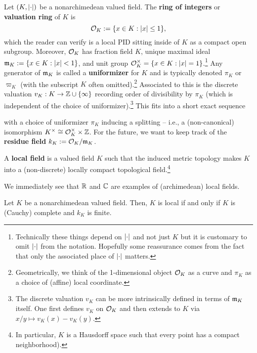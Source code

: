 \documentclass[11pt]{article}
\begin{document}
Let $(K,\left\lvert\cdot\right\rvert)$ be a nonarchimedean valued field. The \textbf{ring of integers} or \textbf{valuation ring} of $K$ is 
$$\mathcal{O}_K:=\{x\in K : |x|\leq1\},$$
which the reader can verify is a local PID sitting inside of $K$ as a compact open subgroup. Moreover, $\mathcal{O}_K$ has fraction field $K$, unique maximal ideal $\mathfrak{m}_K:=\{x\in K : |x|<1\}$, and unit group $\mathcal{O}_K^{\times}=\{x\in K : |x|=1\}$.\footnote{Technically these things depend on $\left\lvert\cdot\right\rvert$ and not just $K$ but it is customary to omit $\left\lvert\cdot\right\rvert$ from the notation. Hopefully some reassurance comes from the fact that only the associated place of $\left\lvert\cdot\right\rvert$ matters.} Any generator of $\mathfrak{m}_K$ is called a \textbf{uniformizer} for $K$ and is typically denoted $\pi_K$ or $\varpi_K$ (with the subscript $K$ often omitted).\footnote{Geometrically, we think of the 1-dimensional object $\mathcal{O}_K$ as a curve and $\pi_K$ as a choice of (affine) local coordinate.} Associated to this is the discrete valuation $v_K: K\to\mathbb{Z}\cup\{\infty\}$ recording order of divisibility by $\pi_K$ (which is independent of the choice of uniformizer).\footnote{The discrete valuation $v_K$ can be more intrinsically defined in terms of $\mathfrak{m}_K$ itself. One first defines $v_K$ on $\mathcal{O}_K$ and then extends to $K$ via $x/y\mapsto v_K(x)-v_K(y)$.} This fits into a short exact sequence
\begin{center}
\end{center}
with a choice of uniformizer $\pi_K$ inducing a splitting -- i.e., a (non-canonical) isomorphism $K^{\times}\cong\mathcal{O}_K^{\times}\times\mathbb{Z}$. For the future, we want to keep track of the \textbf{residue field} $k_K:=\mathcal{O}_K/\mathfrak{m}_K$.

\begin{definition}
A \textbf{local field} is a valued field $K$ such that the induced metric topology makes $K$ into a (non-discrete) locally compact topological field.\footnote{In particular, $K$ is a Hausdorff space such that every point has a compact neighborhood).}
\end{definition}

We immediately see that $\mathbb{R}$ and $\mathbb{C}$ are examples of (archimedean) local fields.

\begin{proposition}
Let $K$ be a nonarchimedean valued field. Then, $K$ is local if and only if $K$ is (Cauchy) complete and $k_K$ is finite.
\end{proposition}
\end{document}
